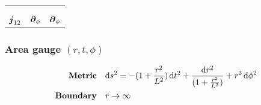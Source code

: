 \documentclass[a4paper,12pt]{article}
\begin{document}
\begin{table}[H]
\begin{adjustbox}{width=0.80\textwidth}
\begin{tabular}{ccc}
{\begin{equation*}
\begin{split}
                        \end{split}
                     \end{equation*}} \\
                     $\boldsymbol{j}_{1 2}$ & $\boldsymbol{\partial}_\phi$ & $\boldsymbol{\partial}_\phi$ \\
                  \bottomrule
               \end{tabular}
            \end{adjustbox}
         \end{table}


         \subsubsection{Area gauge \texorpdfstring{$(r, t, \phi)$}{}}
         \begin{align}
            \text{\textbf{Metric}} &\quad \text{d} s^2 = - (1 + \frac{r^2}{L^2}) \, \text{d} t^2 + \frac{\text{d} r^2}{(1 + \frac{r^2}{L^2})} + r^2 \, \text{d} \phi^2 \\
         \text{\textbf{Boundary}} &\quad r \to \infty
         \end{align}
\end{document}
